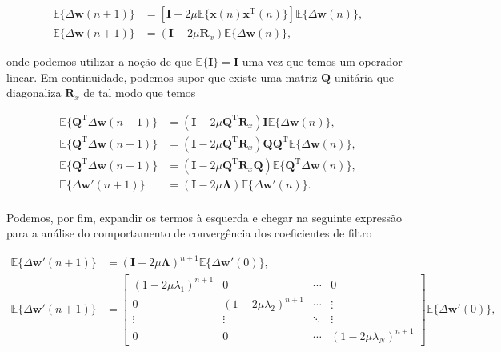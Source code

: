 \documentclass[a4paper,10pt]{article}
\begin{document}
\begin{enumerate}
\begin{enumerate}
						\begin{align}
							\mathbb{E}\{\Delta \mathbf{w}(n + 1)\} &= \left[ \mathbf{I} - 2 \mu \mathbb{E}\{\mathbf{x}(n) \mathbf{x}^{\text{T}}(n)\} \right] \mathbb{E}\{\Delta \mathbf{w}(n)\}, \\
							\mathbb{E}\{\Delta \mathbf{w}(n + 1)\} &= \left( \mathbf{I} - 2 \mu \mathbf{R}_{x} \right) \mathbb{E}\{\Delta \mathbf{w}(n)\},
						\end{align}

						onde podemos utilizar a noção de que $\mathbb{E}\{ \mathbf{I} \} = \mathbf{I}$ uma vez que temos um operador linear. Em continuidade, podemos supor que existe uma matriz $\mathbf{Q}$ unitária que diagonaliza $\mathbf{R}_{x}$
						de tal modo que temos 

						\begin{align}
							\mathbb{E}\{ \mathbf{Q}^{\text{T}} \Delta \mathbf{w}(n + 1) \} &= \left( \mathbf{I} - 2 \mu \mathbf{Q}^{\text{T}} \mathbf{R}_{x} \right) \mathbf{I} \mathbb{E}\{ \Delta \mathbf{w}(n)\}, \\
							\mathbb{E}\{ \mathbf{Q}^{\text{T}} \Delta \mathbf{w}(n + 1) \} &= \left( \mathbf{I} - 2 \mu \mathbf{Q}^{\text{T}} \mathbf{R}_{x} \right) \mathbf{Q} \mathbf{Q}^{\text{T}} \mathbb{E}\{ \Delta \mathbf{w}(n)\}, \\
							\mathbb{E}\{ \mathbf{Q}^{\text{T}} \Delta \mathbf{w}(n + 1) \} &= \left( \mathbf{I} - 2 \mu \mathbf{Q}^{\text{T}} \mathbf{R}_{x} \mathbf{Q} \right) \mathbb{E}\{ \mathbf{Q}^{\text{T}} \Delta \mathbf{w}(n)\}, \\
							\mathbb{E}\{\Delta \mathbf{w}'(n + 1)\} &= \left( \mathbf{I} - 2 \mu \mathbf{\Lambda} \right) \mathbb{E}\{\Delta \mathbf{w}'(n)\}.
						\end{align}

						\paragraph{}Podemos, por fim, expandir os termos à esquerda e chegar na seguinte expressão para a análise do comportamento de convergência dos coeficientes de filtro

						\begin{align}
							\mathbb{E}\{ \Delta \mathbf{w}'(n + 1) \} &= \left( \mathbf{I} - 2 \mu \mathbf{\Lambda} \right)^{n + 1} \mathbb{E}\{\Delta \mathbf{w}'(0)\}, \\
							\mathbb{E}\{ \Delta \mathbf{w}'(n + 1) \} &= 
							\begin{bmatrix}
								(1 - 2 \mu \lambda_{1})^{n + 1} & 0 & \cdots & 0 \\
								0 & (1 - 2 \mu \lambda_{2})^{n + 1} & \cdots & \vdots \\
								\vdots & \vdots & \ddots & \vdots \\
								0 & 0 & \cdots & (1 - 2 \mu \lambda_{N})^{n + 1}
							\end{bmatrix} 
							\mathbb{E}\{ \Delta \mathbf{w}'(0)\},	
						\end{align}


\end{enumerate}
\end{enumerate}
\end{document}
